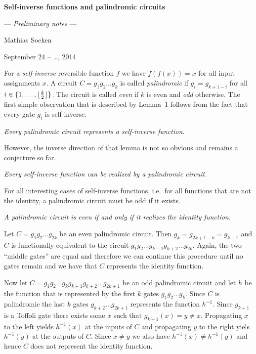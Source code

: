\magnification\magstephalf
\parskip3pt
\baselineskip14pt

\def\slug{\hbox{\kern1.5pt\vrule width2.5pt height6pt depth1.5pt\kern1.5pt}}
\def\slugonright{\vrule width0pt\nobreak\hfill\slug}

\centerline{\bf Self-inverse functions and palindromic circuits}
\centerline{--- {\it Preliminary notes\/} ---}
\centerline{Mathias Soeken}
\centerline{September 24 -- \dots, 2014}

\bigskip
\bigskip

\enspace For a {\it self-inverse\/} reversible
function $f$ we have $f(f(x))=x$ for all input assignments $x$.  A circuit
$C=g_1g_2\dots g_k$ is called {\it palindromic\/} if $ g_i = g_{k+1-i}$ for all
$i \in \{1,\dots,\lfloor{k\over 2}\rfloor\}$.  The circuit is called {\it
even\/} if $k$ is even and {\it odd\/} otherwise.  The first simple observation
that is described by Lemma~1 follows from the fact that every gate $g_i$ is
self-inverse.

 \sl Every palindromic circuit represents a self-inverse
function.\rm

\smallskip\noindent However, the inverse direction of that lemma is not so
obvious and remains a conjecture so far.

\smallskip {} \sl Every self-inverse function can be
realized by a palindromic circuit.\rm

\smallskip\noindent For all interesting cases of self-inverse functions,
i.e.~for all functions that are not the identity, a palindromic circuit must be
odd if it exists.

\smallskip {} \sl A palindromic circuit is even if and only
if it realizes the identity function. \rm

\smallskip{} Let $C=g_1g_2\dots g_{2k}$ be an even
palindromic circuit.  Then $g_{k}=g_{2k+1-k}=g_{k+1}$ and $C$ is functionally
equivalent to the circuit $g_1g_2\dots g_{k-1}g_{k+2} \dots g_{2k}$.  Again, the
two ``middle gates'' are equal and therefore we can continue this procedure
until no gates remain and we have that $C$ represents the identity function.

Now let $C=g_1g_2\dots g_kg_{k+1}g_{k+2}\dots g_{2k+1}$ be an odd palindromic
circuit and let $h$ be the function that is represented by the first $k$ gates
$g_1g_2\dots g_k$.  Since $C$ is palindromic the last $k$ gates $g_{k+2}\dots
g_{2k+1}$ represents the function $h^{-1}$.  Since $g_{k+1}$ is a Toffoli gate
there exists some $x$ such that $g_{k+1}(x)=y\neq x$.  Propagating $x$ to the
left yields $h^{-1}(x)$ at the inputs of $C$ and propagating $y$ to the right
yiels $h^{-1}(y)$ at the outputs of $C$.  Since $x\neq y$ we also have
$h^{-1}(x)\neq h^{-1}(y)$ and hence $C$ does not represent the identity
function.\qquad\slug

